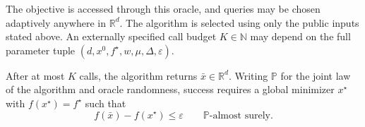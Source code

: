 \documentclass[10pt]{article}
\theoremstyle{definition}
\begin{document}
The objective is accessed through this oracle, and queries may be chosen adaptively anywhere in $\mathbb{R}^d$. The algorithm is selected using only the public inputs stated above. An externally specified call budget $K\in\mathbb{N}$ may depend on the full parameter tuple $(d,x^0,f^\star,w,\mu,\Delta,\varepsilon)$.

After at most $K$ calls, the algorithm returns $\bar{x}\in\mathbb{R}^d$. Writing $\mathbb{P}$ for the joint law of the algorithm and oracle randomness, success requires a global minimizer $x^\star$ with $f(x^\star)=f^\star$ such that
\[
f(\bar{x})-f(x^\star)\leq\varepsilon
\qquad\mathbb{P}\text{-almost surely}.
\]
\end{document}
